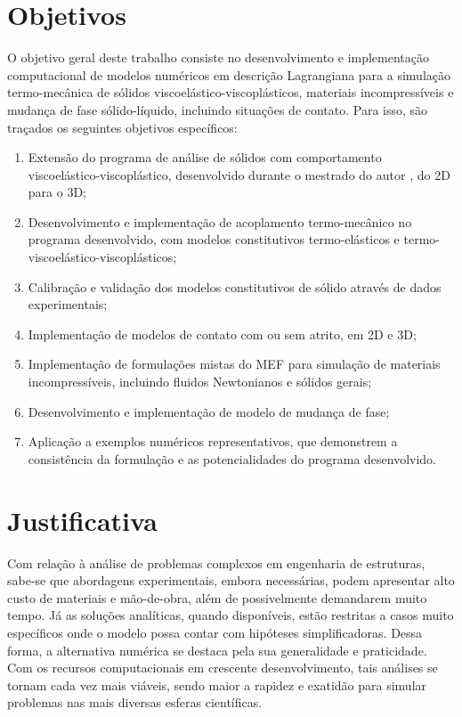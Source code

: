 \documentclass[Tese.tex]{subfiles}
\begin{document}
\section{Objetivos}
\label{Objec}

O objetivo geral deste trabalho consiste no desenvolvimento e implementação
computacional de modelos numéricos em descrição Lagrangiana para a
simulação termo-mecânica de sólidos viscoelástico-viscoplásticos, materiais
incompressíveis e mudança de fase sólido-líquido, incluindo situações de
contato. Para isso, são traçados os seguintes objetivos específicos:

\begin{enumerate}[label=\arabic*),labelwidth=\parindent,noitemsep]
	\item\label{item:programa} Extensão do programa de análise de
          sólidos com comportamento viscoelástico-viscoplástico,
          desenvolvido durante o mestrado do autor \cite{Pericles2019}, do 2D para o 3D;
	\item Desenvolvimento e implementação de acoplamento termo-mecânico no programa desenvolvido, com modelos constitutivos termo-elásticos e termo-viscoelástico-viscoplásticos;
  	\item Calibração e validação dos modelos constitutivos de sólido através de dados experimentais;
	\item Implementação de modelos de contato com ou sem atrito, em 2D e 3D; 
	\item Implementação de formulações mistas do MEF para simulação de materiais incompressíveis, incluindo fluidos Newtonianos e sólidos gerais;
	\item Desenvolvimento e implementação de modelo de mudança de fase;
	\item Aplicação a exemplos numéricos representativos, que demonstrem a consistência da formulação e as potencialidades do programa desenvolvido.
\end{enumerate}

\section{Justificativa}

Com relação à análise de problemas complexos em engenharia de
estruturas, sabe-se que abordagens experimentais, embora necessárias,
podem apresentar alto custo de materiais e mão-de-obra,
além de possivelmente demandarem muito tempo. Já as soluções analíticas, quando
disponíveis, estão restritas a casos muito específicos onde o modelo
possa contar com hipóteses simplificadoras. Dessa forma, a alternativa
numérica se destaca pela sua generalidade e praticidade. Com os
recursos computacionais em crescente desenvolvimento, tais análises se
tornam cada vez mais viáveis, sendo maior a rapidez e exatidão para
simular problemas nas mais diversas esferas científicas.
\end{document}
